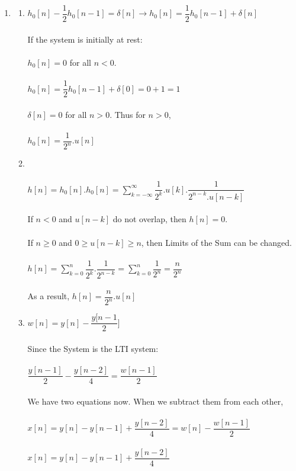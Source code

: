 \documentclass[10pt,a4paper, margin=1in]{article}
\begin{document}
\begin{enumerate}
\item %
    \begin{enumerate}
        \item %
        $h_0[n] - \dfrac{1}{2}h_0[n-1] = \delta[n] \rightarrow h_0[n] = \dfrac{1}{2}h_0[n-1] + \delta[n]$
        \\\\ If the system is initially at rest:
        \\\\ $h_0[n] = 0$ for all $ n<0$.
        \\\\ $h_0[n] = \dfrac{1}{2}h_{0}[n-1] + \delta[0] = 0+1 = 1$
        \\\\ $\delta[n] = 0 $ for all $ n>0.$ Thus for $n>0$,
        \\\\ $h_0[n] =\dfrac{1}{2^{n}} . u[n]$
        \\
        \item %
        \\\\ $h[n] = h_0[n] . h_0[n] = \sum_{k=-\infty}^{\infty} \dfrac{1}{2^{k}} . u[k] . \dfrac{1}{2^{n-k} . u[n-k]}$
        \\\\ If $n<0$ and $u[n-k]$ do not overlap, then $h[n] = 0$.
        \\\\ If $n\geq 0$ and $ 0 \geq u[n-k] \geq n$, then Limits of the Sum can be changed.
        \\\\ $h[n] = \sum_{k=0}^{n} \dfrac{1}{2^{k}} . \dfrac{1}{2^{n-k}} =  \sum_{k=0}^{n} \dfrac{1}{2^{n}} = \dfrac{n}{2^{n}}$
        \\\\ As a result, $h[n] = \dfrac{n}{2^{n}} . u[n]$
        \\
    	\item %
        $ w[n] = y[n] - \dfrac{y[n-1}{2}]$
        \\\\ Since the System is the LTI system:
        \\\\ $\dfrac{y[n-1]}{2} - \dfrac{y[n-2]}{4} = \dfrac{w[n-1]}{2}$
        \\\\ We have two equations now. When we subtract them from each other, 
        \\\\ $x[n] = y[n] - y[n-1] + \dfrac{y[n-2]}{4} = w[n] - \dfrac{w[n-1]}{2}$
        \\\\ $x[n] = y[n] - y[n-1] + \dfrac{y[n-2]}{4}$
        

\end{enumerate}
\end{enumerate}
\end{document}
